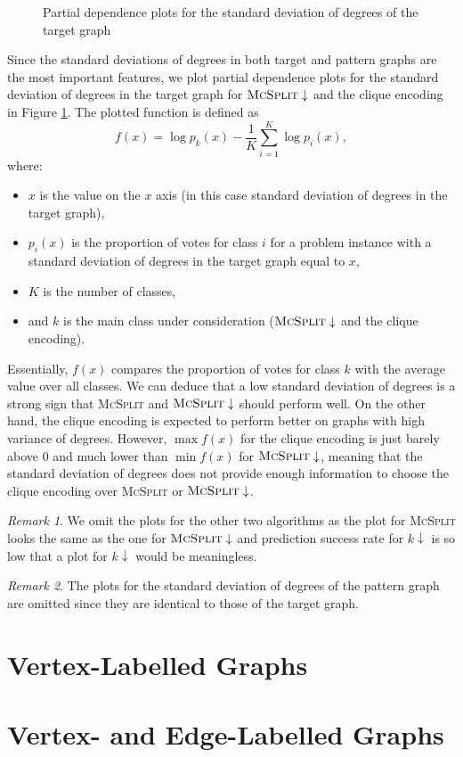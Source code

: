 \documentclass{l4proj}
\theoremstyle{definition}
\theoremstyle{remark}
\newtheorem{remark}{Remark}[section]
\begin{document}
\begin{figure}
\begin{subfigure}[t]{0.49\textwidth}
  \end{subfigure}
  \caption{Partial dependence plots for the standard deviation of degrees of
    the target graph}
  \label{fig:unlabelled_partials}
\end{figure}

Since the standard deviations of degrees in both target and pattern graphs are
the most important features, we plot partial dependence plots for the standard
deviation of degrees in the target graph for $\textsc{McSplit}\downarrow$ and
the clique encoding in Figure \ref{fig:unlabelled_partials}. The plotted
function \cite{forest} is defined as
\[ f(x) = \log{p_k(x)} - \frac{1}{K} \sum_{i=1}^K \log{p_i(x)}, \]
where:

\begin{itemize}
\item $x$ is the value on the $x$ axis (in this case standard deviation of
  degrees in the target graph),
\item $p_i(x)$ is the proportion of votes for class $i$ for a problem instance
  with a standard deviation of degrees in the target graph equal to $x$,
\item $K$ is the number of classes,
\item and $k$ is the main class under consideration
  ($\textsc{McSplit}\downarrow$ and the clique encoding).
\end{itemize}

Essentially, $f(x)$ compares the proportion of votes for class $k$ with the
average value over all classes. We can deduce that a low standard deviation of
degrees is a strong sign that \textsc{McSplit} and $\textsc{McSplit}\downarrow$
should perform well. On the other hand, the clique encoding is expected to
perform better on graphs with high variance of degrees. However, $\max f(x)$ for
the clique encoding is just barely above 0 and much lower than $\min f(x)$ for
$\textsc{McSplit}\downarrow$, meaning that the standard deviation of degrees
does not provide enough information to choose the clique encoding over
\textsc{McSplit} or $\textsc{McSplit}\downarrow$.

\begin{remark}
  We omit the plots for the other two algorithms as the plot for \textsc{McSplit}
  looks the same as the one for $\textsc{McSplit}\downarrow$ and prediction success
  rate for $k\downarrow$ is so low that a plot for $k\downarrow$ would be
  meaningless.
\end{remark}

\begin{remark}
  The plots for the standard deviation of degrees of the pattern graph are
  omitted since they are identical to those of the target graph.
\end{remark}

\section{Vertex-Labelled Graphs}

\section{Vertex- and Edge-Labelled Graphs}




\end{document}
